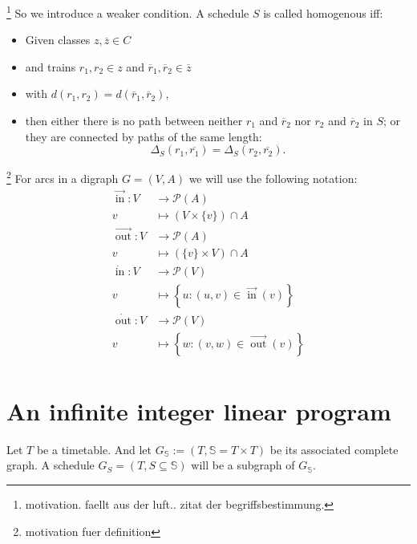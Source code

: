 \documentclass[a4paper]{amsart} %
\newcommand{\ol}[1]{\overline{#1}}
\newcommand{\todo}[1]{\footnote{#1}}
\DeclareMathOperator{\In}{in}
\DeclareMathOperator{\Out}{out}
\newcommand{\ina}{\ensuremath{\vec{\In}}}
\newcommand{\outa}{\ensuremath{\vec{\Out}}}
\newcommand{\inv}{\ensuremath{\dot{\In}}}
\newcommand{\outv}{\ensuremath{\dot{\Out}}}
\begin{document}
\todo{motivation.  faellt aus der luft.. zitat der begriffsbestimmung.}
So we introduce a weaker condition.  A schedule \(S\) is called
homogenous iff:
\begin{itemize}
\item Given classes \(z, \ol{z} \in C\)
\item and trains \(r_1, r_2 \in z\) and \(\ol{r}_1,\ol{r}_2 \in \ol{z}\)
\item with \( d (r_1, r_2) = d(\ol{r}_1, \ol{r}_2) \),
\item then either there is no path between neither \(r_1\) and
  \(\ol{r}_2\) nor \(r_2\) and \(\ol{r}_2\) in \(S\); or they are connected by paths of the same length:
\begin{equation}
\label{homoEq}
  \Delta_S (r_1, \ol{r_1}) = \Delta_S (r_2, \ol{r_2})\textrm{.}
\end{equation}
\end{itemize}


\todo{motivation fuer definition}
For arcs in a digraph \(G=(V,A)\) we will use the following notation:
\begin{align*}
\ina\colon  V &\to \mathcal{P}(A) \\
v &\mapsto \left(V \times \{v\}\right) \cap A\\
\outa\colon  V &\to \mathcal{P}(A) \\
v &\mapsto \left(\{v\} \times V\right) \cap A\\
\inv\colon  V &\to \mathcal{P}(V) \\
v &\mapsto \left\{ u \colon \left(u,v\right) \in \ina(v) \right\}\\
\outv\colon  V &\to \mathcal{P}(V) \\
v &\mapsto \left\{w \colon \left(v,w\right) \in \outa\left(v\right) \right\}\\
\end{align*}

\section{An infinite integer linear program}
\label{infIP}

Let \(T\) be a timetable.  And let \(G_\mathbb{S} := (T, \mathbb{S} =
T \times T) \) be its associated complete graph.  A schedule \(G_S =
(T, S \subseteq \mathbb{S})\) will be a subgraph of \(G_\mathbb{S}\).
\end{document}
